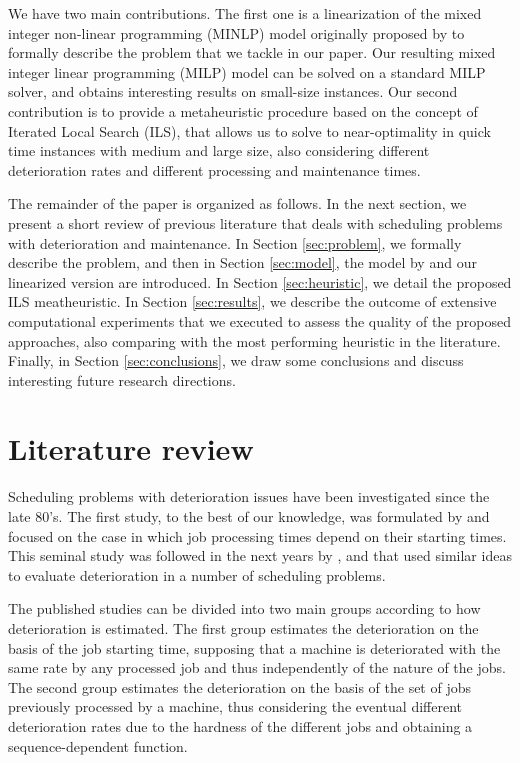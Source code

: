 \documentclass[a4paper,11pt]{article}
\begin{document}
We have two main contributions. The first one is a linearization of the mixed integer non-linear programming (MINLP) model originally proposed by \cite{ruiz2017makespan} to formally describe the problem that we tackle in our paper. Our resulting mixed integer linear programming (MILP) model can be solved on a standard MILP solver, and obtains interesting results on small-size instances. Our second contribution is to provide a metaheuristic procedure based on the concept of Iterated Local Search (ILS), that allows us to solve to near-optimality in quick time instances with medium and large size, also considering different deterioration rates and different processing and maintenance times.
 
The remainder of the paper is organized as follows. In the next section, we present a short review of  previous literature that deals with scheduling problems with deterioration and maintenance. In Section \ref{sec:problem}, we formally describe the problem, and then in Section \ref{sec:model}, the model by \cite{ruiz2017makespan} and our linearized version are introduced.  In Section \ref{sec:heuristic}, we detail the proposed ILS meatheuristic. In Section \ref{sec:results}, we describe the outcome of extensive computational experiments that we executed to assess the quality of the proposed approaches, also comparing with the most performing heuristic in the literature. Finally, in Section \ref{sec:conclusions}, we draw some conclusions and discuss interesting future research directions.  
 
\section{Literature review} \label{sec:literature}%

 Scheduling problems with deterioration issues have been investigated since the late 80's. The first study, to the best of our knowledge, was formulated by \cite{gupta1988single} and focused on the case in which job processing times depend on their starting times. This seminal study was followed in the next years by \cite{browne1990scheduling}, \cite{mosheiov1991v} and \cite{mosheiov1994scheduling} that used similar ideas to evaluate deterioration in a number of scheduling problems. 
 
 The published studies can be divided into two main groups according to how deterioration is estimated. The first group estimates the deterioration on the basis of the job starting time, supposing that a machine is deteriorated with the same rate by any processed job and thus independently of the nature of the jobs. The second group estimates the deterioration on the basis of the set of jobs previously processed by a machine, thus considering the eventual different deterioration rates due to the hardness of the different jobs and obtaining a sequence-dependent function. 
 
\end{document}
